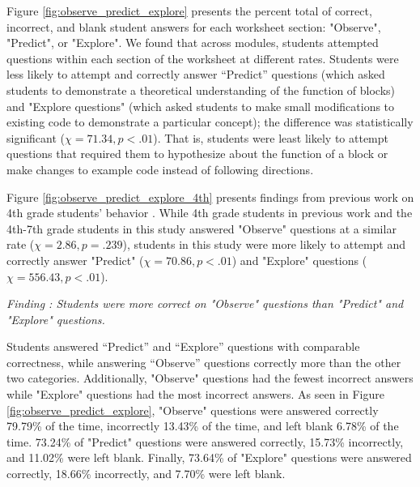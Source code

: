 Figure \ref{fig:observe_predict_explore} presents the percent total of correct, incorrect, and blank student answers for each worksheet section: "Observe", "Predict", or "Explore". We found that across modules, students attempted questions within each section of the worksheet at different rates. Students were less likely to attempt and correctly answer “Predict” questions (which asked students to demonstrate a theoretical understanding of the function of blocks) and "Explore questions" (which asked students to make small modifications to existing code to demonstrate a particular concept); the difference was statistically significant ($\chi=71.34, p<.01$). That is, students were least likely to attempt questions that required them to hypothesize about the function of a block or make changes to example code instead of following directions.

Figure \ref{fig:observe_predict_explore_4th} presents findings from previous work on 4th grade students' \ts{} behavior \cite{franklin2020exploring}. While 4th grade students in previous work and the 4th-7th grade students in this study answered "Observe" questions at a similar rate ($\chi=2.86, p=.239$), students in this study were more likely to attempt and correctly answer "Predict" ($\chi=70.86, p<.01$) and "Explore" questions ($\chi=556.43, p<.01$). 

\textit{Finding : Students were more correct on "Observe" questions than "Predict" and "Explore" questions.} 

Students answered “Predict” and “Explore” questions with comparable correctness, while answering “Observe” questions correctly more than the other two categories. Additionally, "Observe" questions had the fewest incorrect answers while "Explore" questions had the most incorrect answers. As seen in Figure \ref{fig:observe_predict_explore}, "Observe" questions were answered correctly 79.79\% of the time, incorrectly 13.43\% of the time, and left blank 6.78\% of the time. 73.24\% of "Predict" questions were answered correctly, 15.73\% incorrectly, and 11.02\% were left blank. Finally, 73.64\% of "Explore" questions were answered correctly, 18.66\% incorrectly, and 7.70\% were left blank.%

